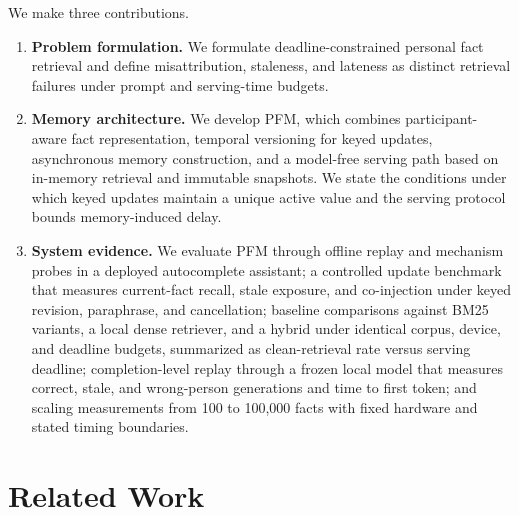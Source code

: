 \documentclass[letterpaper]{article} %
\begin{document}
We make three contributions.
\begin{enumerate}
\item \textbf{Problem formulation.} We formulate deadline-constrained personal fact retrieval and define misattribution, staleness, and lateness as distinct retrieval failures under prompt and serving-time budgets.
\item \textbf{Memory architecture.} We develop PFM, which combines participant-aware fact representation, temporal versioning for keyed updates, asynchronous memory construction, and a model-free serving path based on in-memory retrieval and immutable snapshots. We state the conditions under which keyed updates maintain a unique active value and the serving protocol bounds memory-induced delay.
\item \textbf{System evidence.} We evaluate PFM through offline replay and mechanism probes in a deployed autocomplete assistant; a controlled update benchmark that measures current-fact recall, stale exposure, and co-injection under keyed revision, paraphrase, and cancellation; baseline comparisons against BM25 variants, a local dense retriever, and a hybrid under identical corpus, device, and deadline budgets, summarized as clean-retrieval rate versus serving deadline; completion-level replay through a frozen local model that measures correct, stale, and wrong-person generations and time to first token; and scaling measurements from 100 to 100{,}000 facts with fixed hardware and stated timing boundaries.
\end{enumerate}

\section{Related Work}
\end{document}
